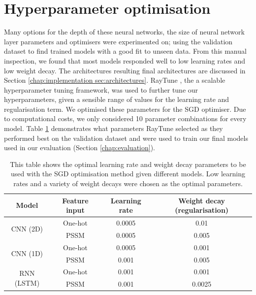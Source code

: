 \documentclass{l4proj}
\begin{document}
\section{Hyperparameter optimisation}
\label{chap:implementation section:hyperparameters}
Many options for the depth of these neural networks, the size of neural network layer parameters and optimisers were experimented on; using the validation dataset to find trained models with a good fit to unseen data. From this manual inspection, we found that most models responded well to low learning rates and low weight decay. The architectures resulting final architectures are discussed in Section \ref{chap:implementation sec:architectures}. RayTune \cite{Liaw:18}, the a scalable hyperparameter tuning framework, was used to further tune our hyperparameters, given a sensible range of values for the learning rate and regularisation term. We optimised these parameters for the SGD optimiser. Due to computational costs, we only considered 10 parameter combinations for every model. Table \ref{tab:hyperparameters} demonstrates what parameters RayTune selected as they performed best on the validation dataset and were used to train our final models used in our evaluation (Section \ref{chap:evaluation}).

\begin{table}[!ht]
    \centering
    \caption{This table shows the optimal learning rate and weight decay parameters to be used with the SGD optimisation method given different models. Low learning rates and a variety of weight decays were chosen as the optimal parameters.}
    
    \begin{tabular}{|c|ccc|}
    \hline
    Model & \multicolumn{1}{c|}{Feature input} & \multicolumn{1}{c|}{Learning rate} & \multicolumn{1}{c|}{Weight decay (regularisation)} \\ \hline
    \multirow{2}{*}{CNN (2D)} & One-hot & 0.0005 & 0.01 \\ \cline{2-4} 
     & PSSM & 0.0005 & 0.005 \\ \hline
    \multirow{2}{*}{CNN (1D)} & One-hot & 0.0005 & 0.001 \\ \cline{2-4} 
     & PSSM & 0.001 & 0.005 \\ \hline
    \multirow{2}{*}{RNN (LSTM)} & One-hot & 0.001 & 0.001 \\ \cline{2-4} 
     & PSSM & 0.001 & 0.0025 \\ \hline
    \end{tabular}

    \label{tab:hyperparameters} 
\end{table}
\end{document}

